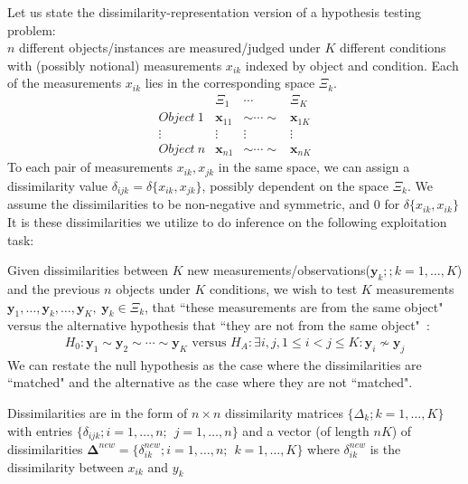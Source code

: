 \documentclass[11pt]{article} %
\begin{document}
Let us state the dissimilarity-representation version of a hypothesis testing problem:\\
$n$ different objects/instances are measured/judged under $K$ different conditions with (possibly notional) measurements $x_{ik}$ indexed by object and condition. Each of the measurements $x_{ik}$ lies in  the corresponding space $\Xi_k$. 
\[  \begin{array}{cccc}
        & \Xi_1 & \cdots & \Xi_K\\
        Object ~ 1 & \bm{x}_{11} & \sim \cdots \sim & \bm{x}_{1K} \\
        \vdots & \vdots & \vdots & \vdots \\
        Object ~ n & \bm{x}_{n1} & \sim \cdots \sim & \bm{x}_{nK}
      \end{array}      
\]
To each pair of measurements $x_{ik},x_{jk}$ in the same space, we can assign a dissimilarity value $\delta_{ijk}=\delta\{x_{ik},x_{jk}\}$, possibly dependent on the space $\Xi_k$. We assume the dissimilarities to be non-negative and  symmetric, and 0 for $\delta\{x_{ik},x_{ik}\}$  It is these  dissimilarities we utilize to do inference on the following exploitation task:

 Given dissimilarities between  $K$ new measurements/observations($\bm{y}_{k};;k=1,\ldots,K$) and the previous 
$n$ objects under $K$ conditions, we wish to test  $K$ measurements $\bm{y}_1,\ldots,\bm{y}_k,\ldots,\bm{y}_K ,\hspace{3pt} \bm{y}_k\in\Xi_k$,  that ``these measurements are from the same  object"  versus the alternative hypothesis that ``they are not  from the same  object"~\cite{JOFC}:
    \[
\begin{array}{l}
    H_0: \bm{y}_{1} \sim \bm{y}_{2} \sim \cdots \sim \bm{y}_{K}
 \text{ versus } 
 H_A: \exists i, j , 1\leq i < j \leq K :\bm{y}_{i} \nsim \bm{y}_{j}  
\end{array}
\]
We can restate the null hypothesis as the case where the dissimilarities are ``matched" and the alternative as the case where they are not ``matched".

Dissimilarities are in the form  of $n \times n$  dissimilarity matrices $\{\Delta_k;k=1,\ldots,K\}$ with entries $\{\delta_{ijk} ;  i=1,\ldots,n;\hspace{5pt} j=1,\ldots,n\}$  and a  vector (of length $nK$) of dissimilarities  $\mathbf{\Delta}^{new}=\{ \delta_{ik}^{new}; i=1,\ldots, n;\hspace{5pt} k=1,\ldots,K\}  $  where $\delta_{ik}^{new} $ is the dissimilarity  between  $x_{ik}$ and $y_k$
\end{document}
